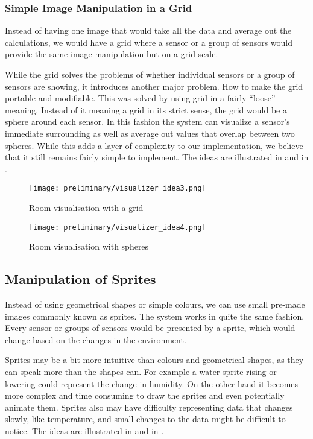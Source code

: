 \documentclass[../document]{subfiles}
\begin{document}
\subsubsection{Simple Image Manipulation in a Grid}
Instead of having one image that would take all the data and average out the calculations, we would have a grid where a sensor or a group of sensors would provide the same image manipulation but on a grid scale.

While the grid solves the problems of whether individual sensors or a group of sensors are showing, it introduces another major problem. How to make the grid portable and modifiable. This was solved by using grid in a fairly “loose” meaning. Instead of it meaning a grid in its strict sense, the grid would be a sphere around each sensor. In this fashion the system can visualize a sensor’s immediate surrounding as well as average out values that overlap between two spheres. While this adds a layer of complexity to our implementation, we believe that it still remains fairly simple to implement. The ideas are illustrated in   and in .

\begin{figure}
	\texttt{[image: preliminary/visualizer\_idea3.png]}
	\caption{Room visualisation with a grid}
	\label{fig:visualizer_idea3}
\end{figure}

\begin{figure}
	\texttt{[image: preliminary/visualizer\_idea4.png]}
	\caption{Room visualisation with spheres}
	\label{fig:visualizer_idea4}
\end{figure}

\subsection{Manipulation of Sprites}
Instead of using geometrical shapes or simple colours, we can use small pre-made images commonly known as sprites. The system works in quite the same fashion. Every sensor or groups of sensors would be presented by a sprite, which would change based on the changes in the environment.

Sprites may be a bit more intuitive than colours and geometrical shapes, as they can speak more than the shapes can. For example a water sprite rising or lowering could represent the change in humidity. On the other hand it becomes more complex and time consuming to draw the sprites and even potentially animate them. Sprites also may have difficulty representing data that changes slowly, like temperature, and small changes to the data might be difficult to notice. The ideas are illustrated in   and in .
\end{document}

